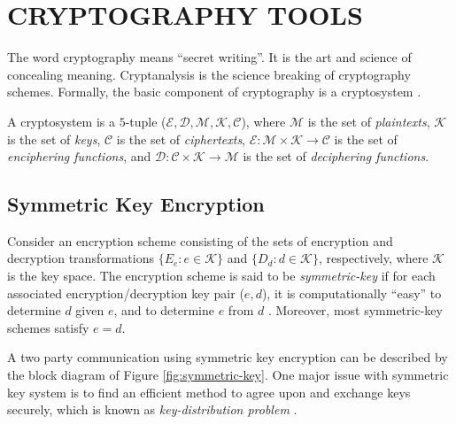 \chapter{CRYPTOGRAPHY TOOLS} %
\label{cha:Cryptography tools}

	The word cryptography means ``secret writing''.
	It is the art and science of concealing meaning.
	Cryptanalysis is the science breaking of cryptography schemes.
	Formally, the basic component of cryptography is a cryptosystem \cite{bishop2004introduction}.
	\begin{definition}
		A cryptosystem is a $5$-tuple ($ \mathcal{E,D,M,K,C}$), where $\mathcal{M}$ is the set of \textit{plaintexts}, $\mathcal{K}$ is the set of \textit{keys}, $\mathcal{C}$ is the set of \textit{ciphertexts}, $\mathcal{E}:\mathcal{M} \times \mathcal{K} \rightarrow \mathcal{C}$ is the set of \textit{enciphering functions}, and $\mathcal{D}:\mathcal{C} \times \mathcal{K} \rightarrow \mathcal{M}$ is the set of \textit{deciphering functions}.
	\end{definition}

\section{Symmetric Key Encryption}
	Consider an encryption scheme consisting of the sets of encryption and decryption transformations $\{E_{e}: e \in \mathcal{K}\}$ and $\{D_{d}: d \in \mathcal{K}\}$, respectively, where $\mathcal{K}$ is the key space.
	The encryption scheme is said to be \textit{symmetric-key} if for each associated encryption/decryption key pair ($e,d$), it is computationally ``easy'' to determine $d$ given $e$, and to determine $e$ from $d$ \cite{menezes2010handbook}.
	Moreover, most symmetric-key schemes satisfy $e = d$.

	A two party communication using symmetric key encryption can be described by the block diagram of Figure \ref{fig:symmetric-key}. 
	One major issue with symmetric key system is to find an efficient method to agree upon and exchange keys securely, which is known as \textit{key-distribution problem} \cite{menezes2010handbook}. 

